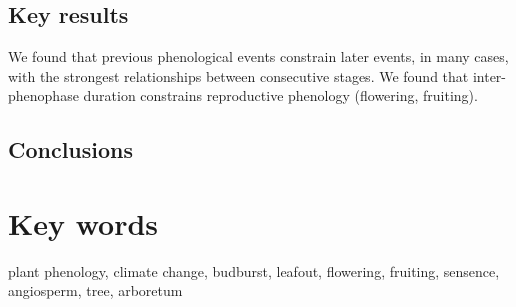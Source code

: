 \documentclass{article}
\begin{document}
\subsection*{Key results}
We found that previous phenological events constrain later events, in many cases, with the strongest relationships between consecutive stages. We found that inter-phenophase duration constrains reproductive phenology (flowering, fruiting).
\subsection*{Conclusions}

\section* {Key words}
plant phenology, climate change, budburst, leafout, flowering, fruiting, sensence, angiosperm, tree, arboretum
\end{document}
